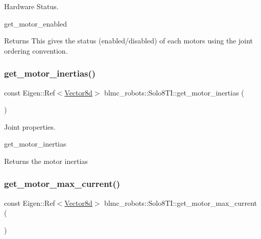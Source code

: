 Hardware Status. 

get\+\_\+motor\+\_\+enabled \begin{DoxyReturn}{Returns}
This gives the status (enabled/disabled) of each motors using the joint ordering convention. 
\end{DoxyReturn}
\mbox{\label{classblmc__robots_1_1Solo8TI_a21b4faac39d48f464cd29aea1c2eb9e2}} 
\subsubsection{\texorpdfstring{get\+\_\+motor\+\_\+inertias()}{get\_motor\_inertias()}}
{\footnotesize\ttfamily const Eigen\+::\+Ref$<$\hyperlink{common__header_8hpp_a98975ffbe0bca1296078e0350dfedd60}{Vector8d}$>$ blmc\+\_\+robots\+::\+Solo8\+T\+I\+::get\+\_\+motor\+\_\+inertias (\begin{DoxyParamCaption}{ }\end{DoxyParamCaption})\hspace{0.3cm}{\ttfamily [inline]}}



Joint properties. 

get\+\_\+motor\+\_\+inertias \begin{DoxyReturn}{Returns}
the motor inertias 
\end{DoxyReturn}
\mbox{\label{classblmc__robots_1_1Solo8TI_a6258a43a859e3cb589e7ed4ad7ca23cc}} 
\subsubsection{\texorpdfstring{get\+\_\+motor\+\_\+max\+\_\+current()}{get\_motor\_max\_current()}}
{\footnotesize\ttfamily const Eigen\+::\+Ref$<$\hyperlink{common__header_8hpp_a98975ffbe0bca1296078e0350dfedd60}{Vector8d}$>$ blmc\+\_\+robots\+::\+Solo8\+T\+I\+::get\+\_\+motor\+\_\+max\+\_\+current (\begin{DoxyParamCaption}{ }\end{DoxyParamCaption})\hspace{0.3cm}{\ttfamily [inline]}}



